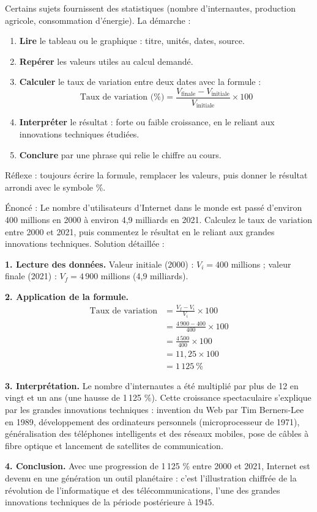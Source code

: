 \documentclass[11pt]{article}
\begin{document}
\begin{methode}
Certains sujets fournissent des statistiques (nombre d'internautes, production agricole, consommation d'énergie). La démarche :
\begin{enumerate}
\item \textbf{Lire} le tableau ou le graphique : titre, unités, dates, source.
\item \textbf{Repérer} les valeurs utiles au calcul demandé.
\item \textbf{Calculer} le taux de variation entre deux dates avec la formule :
\[ \text{Taux de variation (\%)} = \frac{V_{\text{finale}} - V_{\text{initiale}}}{V_{\text{initiale}}} \times 100 \]
\item \textbf{Interpréter} le résultat : forte ou faible croissance, en le reliant aux innovations techniques étudiées.
\item \textbf{Conclure} par une phrase qui relie le chiffre au cours.
\end{enumerate}
Réflexe : toujours écrire la formule, remplacer les valeurs, puis donner le résultat arrondi avec le symbole \%.
\end{methode}

\begin{exoresolu}
Énoncé : Le nombre d'utilisateurs d'Internet dans le monde est passé d'environ 400 millions en 2000 à environ 4,9 milliards en 2021. Calculez le taux de variation entre 2000 et 2021, puis commentez le résultat en le reliant aux grandes innovations techniques.
\tcblower
Solution détaillée :

\textbf{1. Lecture des données.} Valeur initiale (2000) : $V_i = 400$ millions ; valeur finale (2021) : $V_f = 4\,900$ millions (4,9 milliards).

\textbf{2. Application de la formule.}
\begin{align*}
\text{Taux de variation} &= \frac{V_f - V_i}{V_i} \times 100 \\
&= \frac{4\,900 - 400}{400} \times 100 \\
&= \frac{4\,500}{400} \times 100 \\
&= 11,25 \times 100 \\
&= 1\,125\ \%
\end{align*}

\textbf{3. Interprétation.} Le nombre d'internautes a été multiplié par plus de 12 en vingt et un ans (une hausse de 1\,125 \%). Cette croissance spectaculaire s'explique par les grandes innovations techniques : invention du Web par Tim Berners-Lee en 1989, développement des ordinateurs personnels (microprocesseur de 1971), généralisation des téléphones intelligents et des réseaux mobiles, pose de câbles à fibre optique et lancement de satellites de communication.

\textbf{4. Conclusion.} Avec une progression de 1\,125 \% entre 2000 et 2021, Internet est devenu en une génération un outil planétaire : c'est l'illustration chiffrée de la révolution de l'informatique et des télécommunications, l'une des grandes innovations techniques de la période postérieure à 1945.
\end{exoresolu}
\end{document}
